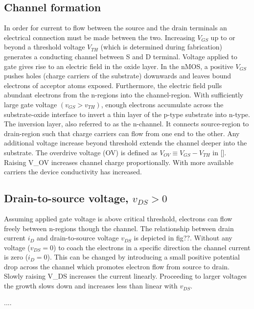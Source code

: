 \subsection{Channel formation}
In order for current to flow between the source and the drain terminals an electrical connection must be made between the two. Increasing $V_{GS}$ up to or beyond a threshold voltage $V_{TH}$ (which is determined during fabrication) generates a conducting channel between S and D terminal. Voltage applied to gate gives rise to an electric field in the oxide layer. In the nMOS, a positive $V_{GS}$ pushes holes (charge carriers of the substrate) downwards and leaves bound electrons of acceptor atoms exposed. Furthermore, the electric field pulls abundant electrons from the n-regions into the channel-region.  With sufficiently large gate voltage $(v_{{GS}}>v_{TH})$, enough electrons accumulate across the substrate-oxide interface to invert a thin layer of the p-type substrate into n-type. The inversion layer, also referred to as the n-channel. It connects source-region to drain-region such that charge carriers can flow from one end to the other.
Any additional voltage increase beyond threshold extends the channel deeper into the substrate. The overdrive voltage (OV) is defined as $V_{OV}≡V_{GS}-V_{TH}$ in []. Raising V\_OV increases channel charge proportionally. With more available carriers the device conductivity has increased.


\subsection{Drain-to-source voltage, $v_{DS}>0$}
Assuming applied gate voltage is above critical threshold, electrons can flow freely between n-regions though the channel. The relationship between drain current $i_D$ and drain-to-source voltage $v_{DS}$ is depicted in fig??. Without any voltage ($v_{DS}=0$) to coach the electrons in a specific direction the channel current is zero ($i_D=0$). This can be changed by introducing a small positive potential drop across the channel which promotes electron flow from source to drain. Slowly raising V\_DS increases the current linearly. Proceeding to larger voltages the growth slows down and increases less than linear with $v_{DS}$.

....
